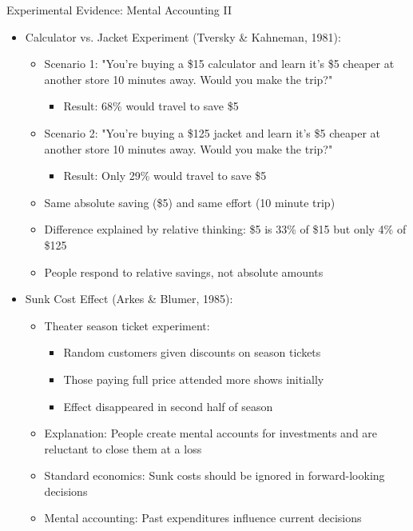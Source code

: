 \documentclass[10pt]{beamer}
\begin{document}
\begin{frame}{Experimental Evidence: Mental Accounting II}
  \begin{itemize}[<+->]
    \item Calculator vs. Jacket Experiment (Tversky \& Kahneman, 1981):
      \begin{itemize}
        \item Scenario 1: "You're buying a \$15 calculator and learn it's \$5 cheaper at another store 10 minutes away. Would you make the trip?"
          \begin{itemize}
            \item Result: 68\% would travel to save \$5
          \end{itemize}
        \item Scenario 2: "You're buying a \$125 jacket and learn it's \$5 cheaper at another store 10 minutes away. Would you make the trip?"
          \begin{itemize}
            \item Result: Only 29\% would travel to save \$5
          \end{itemize}
        \item Same absolute saving (\$5) and same effort (10 minute trip)
        \item Difference explained by relative thinking: \$5 is 33\% of \$15 but only 4\% of \$125
        \item People respond to relative savings, not absolute amounts
      \end{itemize}
    \item Sunk Cost Effect (Arkes \& Blumer, 1985):
      \begin{itemize}
        \item Theater season ticket experiment:
          \begin{itemize}
            \item Random customers given discounts on season tickets
            \item Those paying full price attended more shows initially
            \item Effect disappeared in second half of season
          \end{itemize}
        \item Explanation: People create mental accounts for investments and are reluctant to close them at a loss
        \item Standard economics: Sunk costs should be ignored in forward-looking decisions
        \item Mental accounting: Past expenditures influence current decisions
      \end{itemize}
  \end{itemize}
\end{frame}
\end{document}
